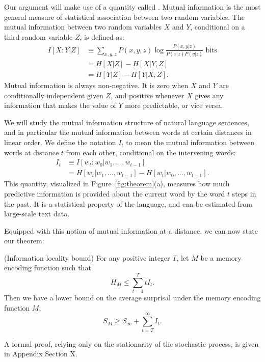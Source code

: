Our argument will make use of a quantity called . Mutual information is the most general measure of statistical association between two random variables. The mutual information between two random variables $X$ and $Y$, conditional on a third random variable $Z$, is defined as:
\begin{align}
    I[X:Y|Z] &\equiv \sum_{x,y,z} P(x,y,z) \log \frac{P(x,y|z)}{P(x|z)P(y|z)} \text{ bits} \\
    &= H[X|Z] - H[X|Y,Z] \\
    &= H[Y|Z] - H[Y|X,Z].
\end{align}
Mutual information is always non-negative. It is zero when $X$ and $Y$ are conditionally independent given $Z$, and positive whenever $X$ gives any information that makes the value of $Y$ more predictable, or vice versa. 

We will study the mutual information structure of natural language sentences, and in particular the mutual information between words at certain distances in linear order. We define the notation $I_t$ to mean the mutual information between words at distance $t$ from each other, conditional on the intervening words:
\begin{align}
    I_t &\equiv I[w_t : w_0 | w_1, \dots, w_{t-1}] \\
    &= H[w_t | w_1, \dots, w_{t-1}] - H[w_t | w_0, \dots, w_{t-1}].
\end{align}
This quantity, visualized in Figure~\ref{fig:theorem}(a), measures how much predictive information is provided about the current word by the word $t$ steps in the past.
It is a statistical property of the language, and can be estimated from large-scale text data.

Equipped with this notion of mutual information at a distance, we can now state our theorem:
\begin{thm}\label{prop:suboptimal}(Information locality bound) For any positive integer $T$, let $M$ be a memory encoding function such that
\begin{equation}
\label{eq:memory-bound}
H_M \le \sum_{t=1}^T t I_t.    
\end{equation}
Then we have a lower bound on the average surprisal under the memory encoding function $M$:
\begin{equation}
\label{eq:surprisal-bound}
S_M \ge S_\infty + \sum_{t=T}^\infty I_t.
\end{equation}
\end{thm}
A formal proof, relying only on the stationarity of the stochastic process, is given in Appendix Section X. 

